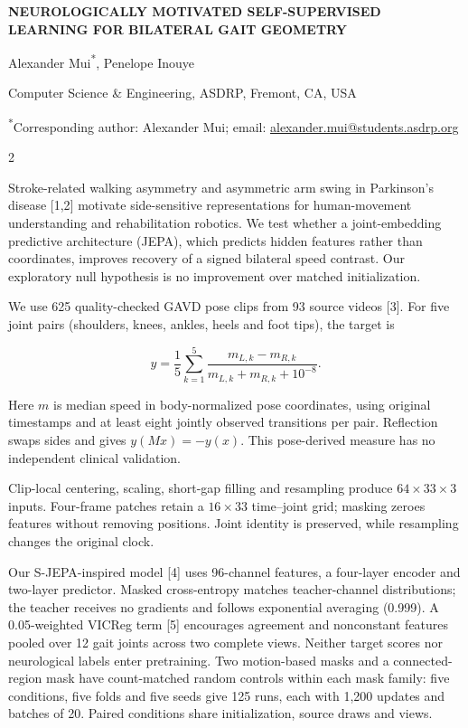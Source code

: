 \documentclass[11pt,letterpaper]{article}
\newcommand{\risexheading}[1]{\par\vspace{4pt}{\bfseries\underline{#1}}\par\nobreak\vspace{1pt}}
\begin{document}
\fontsize{11}{12.5}\selectfont
{\centering
  {\bfseries\MakeUppercase{Neurologically Motivated Self-Supervised}\\
   \MakeUppercase{Learning for Bilateral Gait Geometry}\par}
  Alexander Mui\textsuperscript{*}, Penelope Inouye\par
  Computer Science \& Engineering, ASDRP, Fremont, CA, USA\par
  \textsuperscript{*}Corresponding author: Alexander Mui; email: \href{mailto:alexander.mui@students.asdrp.org}{alexander.mui@students.asdrp.org}\par
}
\begin{multicols}{2}
\risexheading{INTRODUCTION}

Stroke-related walking asymmetry and asymmetric arm swing in Parkinson's
disease {[}1,2{]} motivate side-sensitive representations for
human-movement understanding and rehabilitation robotics. We test
whether a joint-embedding predictive architecture (JEPA), which predicts
hidden features rather than coordinates, improves recovery of a signed
bilateral speed contrast. Our exploratory null hypothesis is no
improvement over matched initialization.

\risexheading{MATERIALS AND METHODS}

We use 625 quality-checked GAVD pose clips from 93 source videos
{[}3{]}. For five joint pairs (shoulders, knees, ankles, heels and foot
tips), the target is

\[
y=\frac{1}{5}\sum_{k=1}^{5}\frac{m_{L,k}-m_{R,k}}{m_{L,k}+m_{R,k}+10^{-8}}.
\]

Here \(m\) is median speed in body-normalized pose coordinates, using
original timestamps and at least eight jointly observed transitions per
pair. Reflection swaps sides and gives \(y(Mx)=-y(x)\). This
pose-derived measure has no independent clinical validation.

Clip-local centering, scaling, short-gap filling and resampling produce
\(64\times33\times3\) inputs. Four-frame patches retain a \(16\times33\)
time--joint grid; masking zeroes features without removing positions.
Joint identity is preserved, while resampling changes the original
clock.

Our S-JEPA-inspired model {[}4{]} uses 96-channel features, a four-layer
encoder and two-layer predictor. Masked cross-entropy matches
teacher-channel distributions; the teacher receives no gradients and
follows exponential averaging (0.999). A 0.05-weighted VICReg term
{[}5{]} encourages agreement and nonconstant features pooled over 12
gait joints across two complete views. Neither target scores nor
neurological labels enter pretraining. Two motion-based masks and a
connected-region mask have count-matched random controls within each
mask family: five conditions, five folds and five seeds give 125 runs,
each with 1,200 updates and batches of 20. Paired conditions share
initialization, source draws and views.


\end{multicols}
\end{document}
